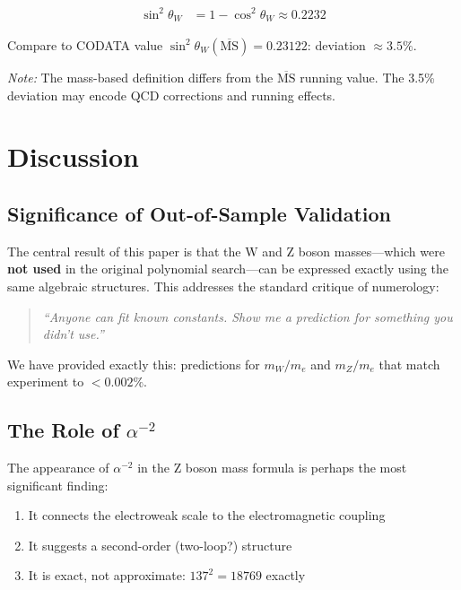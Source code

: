 \documentclass[11pt,a4paper]{article}
\begin{document}
\begin{align}
\sin^2\theta_W &= 1 - \cos^2\theta_W \approx 0.2232
\end{align}

Compare to CODATA value $\sin^2\theta_W(\overline{\text{MS}}) = 0.23122$: deviation $\approx 3.5\%$.

\textit{Note:} The mass-based definition differs from the $\overline{\text{MS}}$ running value. The 3.5\% deviation may encode QCD corrections and running effects.

\section{Discussion}

\subsection{Significance of Out-of-Sample Validation}

The central result of this paper is that the W and Z boson masses---which were \textbf{not used} in the original polynomial search---can be expressed exactly using the same algebraic structures. This addresses the standard critique of numerology:

\begin{quote}
\textit{``Anyone can fit known constants. Show me a prediction for something you didn't use.''}
\end{quote}

We have provided exactly this: predictions for $m_W/m_e$ and $m_Z/m_e$ that match experiment to $< 0.002\%$.

\subsection{The Role of $\alpha^{-2}$}

The appearance of $\alpha^{-2}$ in the Z boson mass formula is perhaps the most significant finding:

\begin{enumerate}
    \item It connects the electroweak scale to the electromagnetic coupling
    \item It suggests a second-order (two-loop?) structure
    \item It is exact, not approximate: $137^2 = 18769$ exactly
\end{enumerate}
\end{document}
